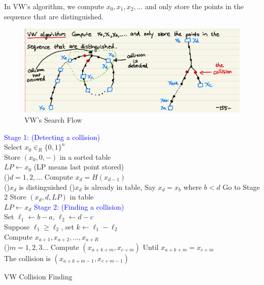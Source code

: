 \documentclass[12pt,titlepage]{article}
\begin{document}
In VW's algorithm, we compute $x_0, x_1, x_2, ...$ and only store the points in the sequence that are distinguished. 

\begin{center}
	\begin{figure}[h!]
		\includegraphics[width=\textwidth]{VW_2.png}
		\caption{VW's Search Flow}
	\end{figure}
\end{center}

\begin{algorithm}
	\textcolor{blue}{Stage 1: (Detecting a collision)}\\
	Select $x_0 \in_R \{0,1\}^n$\\
	Store $(x_0, 0, -)$ in a sorted table\\
	$LP \leftarrow x_0$ (LP means last point stored)\\
	\For(){$d=1,2,...$}{
		Compute $x_d = H(x_{d-1})$\\
		\If(){$x_d$ is distinguished}{
			\If(){$x_d$ is already in table, Say $x_d = x_b$ where $b < d$}{
				Go to Stage 2
			} 
			Store $(x_d, d, LP)$ in table\\
			$LP \leftarrow x_d$
		}
	}
	\textcolor{blue}{Stage 2: (Finding a collision)}\\
	Set $\ell_1 \leftarrow b-a$, $\ell_2 \leftarrow d-c$\\
	Suppose $\ell_1 \geq \ell_2$, set $k \leftarrow \ell_1 - \ell_2$\\
	Compute $x_{a+1}, x_{a+2}, ..., x_{a+R}$\\
	\For(){$m = 1,2,3...$}{
		Compute $(x_{a+k+m}, x_{c+m})$
	}
	Until $x_{a+k+m} = x_{c+m}$\\
	The collision is $(x_{a+k+m-1}, x_{c+m-1})$
	\caption{VW Collision Finding}
\end{algorithm}
\end{document}
